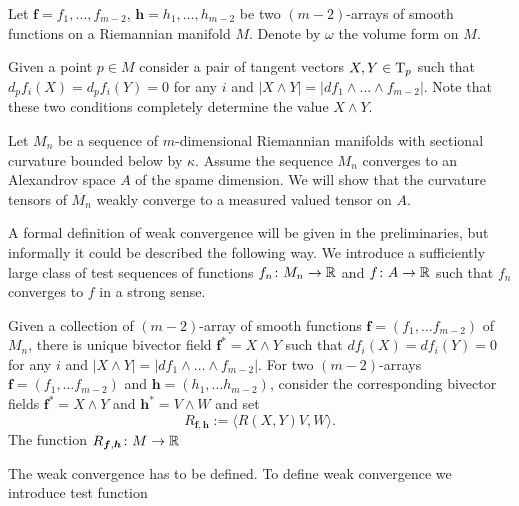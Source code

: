 Let $\bm{f}=f_1,\dots,f_{m-2}$, 
$\bm{h}=h_1,\dots,h_{m-2}$ be two $(m-2)$-arrays of smooth functions on a Riemannian manifold $M$.
Denote by $\omega$ the volume form on $M$.

Given a point $p\in M$ consider a pair of tangent vectors $X,Y\in \text{\rm T}_p$ such that 
$d_pf_i(X)=d_pf_i(Y)=0$ for any $i$ and $|X\wedge Y|=|df_1\wedge \dots\wedge f_{m-2}|$.
Note that these two conditions completely determine the value $X\wedge Y$.

Let $M_n$ be a sequence of $m$-dimensional Riemannian manifolds with sectional curvature bounded below by $\kappa$.
Assume the sequence $M_n$ converges to an Alexandrov space $A$ of the spame dimension.
We will show that the curvature tensors of $M_n$ weakly converge to a measured valued tensor on $A$.

A formal definition of weak convergence will be given in the preliminaries,
but informally it could be described the following way.
We introduce a sufficiently large class of test sequences of functions $f_n\colon M_n\to\mathbb{R}$ and $f\colon A\to \mathbb{R}$ such that $f_n$ converges to $f$ in a strong sense.

Given a collection of $(m-2)$-array of smooth functions $\bm{f}=(f_1,\dots f_{m-2})$ of $M_n$,
there is unique bivector field $\bm{f}^*=X\wedge Y$ such that $df_i(X)=df_i(Y)=0$ for any $i$ and 
$|X\wedge Y|=|df_1\wedge \dots\wedge f_{m-2}|$.
For two $(m-2)$-arrays $\bm{f}=(f_1,\dots f_{m-2})$ and $\bm{h}=(h_1,\dots h_{m-2})$, consider the corresponding bivector fields $\bm{f}^*=X\wedge Y$ and $\bm{h}^*=V\wedge W$ and set
\[R_{\bm{f},\bm{h}}:=\langle R(X,Y)V,W\rangle.\]
The function $R_{\bm{f},\bm{h}}\colon M\to \mathbb{R}$

The weak convergence has to be defined.
To define weak convergence we introduce test function
